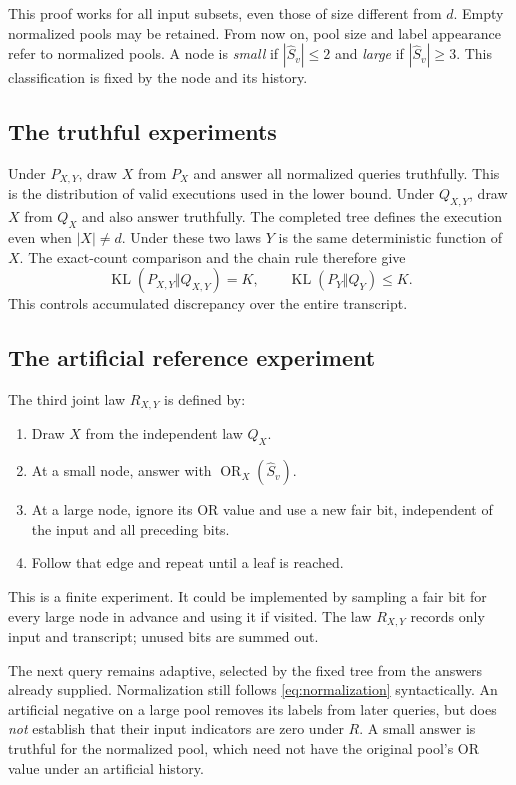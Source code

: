 \documentclass[11pt]{article}
\theoremstyle{definition}
\theoremstyle{remark}
\newcommand{\KL}{\operatorname{KL}}
\newcommand{\OR}{\operatorname{OR}}
\numberwithin{equation}{section}
\begin{document}
This proof works for all input subsets, even those of size different
from \(d\). Empty normalized pools may be retained.
From now on, pool size and label appearance refer to normalized
pools. A node is \emph{small} if \(|\widehat S_v|\le2\) and
\emph{large} if \(|\widehat S_v|\ge3\).
This classification is fixed by the node and its history.

\subsection{The truthful experiments}

Under \(P_{X,Y}\), draw \(X\) from \(P_X\) and answer all normalized
queries truthfully. This is the distribution of valid executions
used in the lower bound.
Under \(Q_{X,Y}\), draw \(X\) from \(Q_X\) and also answer truthfully.
The completed tree defines the execution even when \(|X|\ne d\).
Under these two laws \(Y\) is the same deterministic function of \(X\).
The exact-count comparison and the chain rule therefore give
\begin{equation}\label{eq:truthfulcomparison}
 \KL(P_{X,Y}\Vert Q_{X,Y})=K,\qquad \KL(P_Y\Vert Q_Y)\le K.
\end{equation}
This controls accumulated discrepancy over the entire transcript.

\subsection{The artificial reference experiment}

The third joint law \(R_{X,Y}\) is defined by:
\begin{enumerate}
\item Draw \(X\) from the independent law \(Q_X\).
\item At a small node, answer with \(\OR_X(\widehat S_v)\).
\item At a large node, ignore its OR value and use a new fair bit,
independent of the input and all preceding bits.
\item Follow that edge and repeat until a leaf is reached.
\end{enumerate}
This is a finite experiment. It could be implemented by sampling a
fair bit for every large node in advance and using it if visited.
The law \(R_{X,Y}\) records only input and transcript; unused bits
are summed out.

The next query remains adaptive, selected by the fixed tree from the
answers already supplied. Normalization still follows
\eqref{eq:normalization} syntactically.
An artificial negative on a large pool removes its labels from later
queries, but does \emph{not} establish that their input indicators
are zero under \(R\).
A small answer is truthful for the normalized pool, which need not
have the original pool's OR value under an artificial history.
\end{document}
